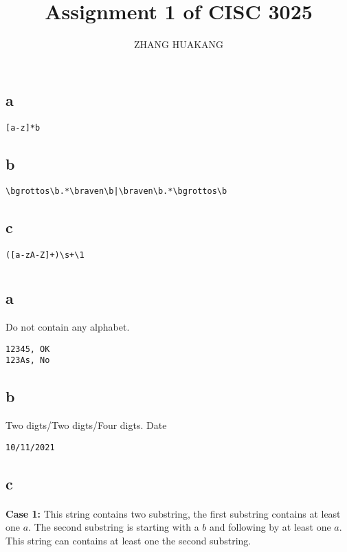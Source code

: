 \documentclass{article}
\title{Assignment 1 of CISC 3025}
\author{ZHANG HUAKANG}
\begin{document}
    \maketitle
    \section{}
    \subsection*{a}
    \begin{verbatim}
[a-z]*b
    \end{verbatim}
    \subsection*{b}
    \begin{verbatim}
\bgrottos\b.*\braven\b|\braven\b.*\bgrottos\b
    \end{verbatim}
    \subsection*{c}
    \begin{verbatim}
([a-zA-Z]+)\s+\1
    \end{verbatim}
    \section{}
    \subsection*{a}
    Do not contain any alphabet.
    \begin{verbatim}
12345, OK
123As, No
    \end{verbatim}
    \subsection*{b}
    Two digts/Two digts/Four digts.
    Date
    \begin{verbatim}
10/11/2021
    \end{verbatim}
    \subsection*{c}
    \paragraph{}
    \textbf{Case 1:}
    This string contains two substring, the first substring contains at least one $a$. The second substring is starting with a $b$ and following by at least one $a$. This string can contains at least one the second substring.
\end{document}
